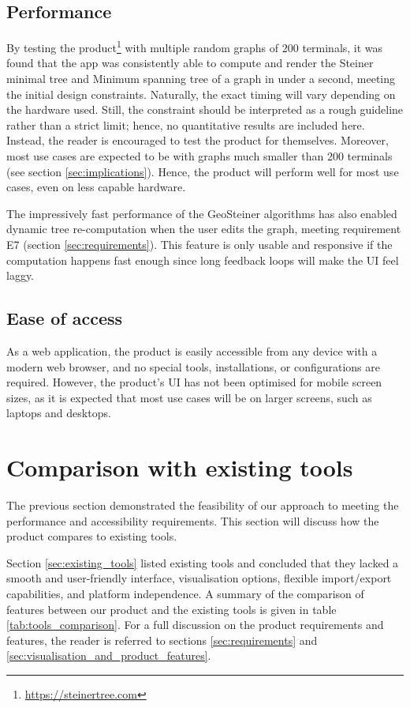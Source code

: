 \documentclass{l4proj}
\begin{document}
\subsection{Performance}
\label{sec:performance}
By testing the product\footnote{\url{https://steinertree.com}} with multiple random graphs of 200 terminals, it was found that the app was consistently able to compute and render the Steiner minimal tree and Minimum spanning tree of a graph in under a second, meeting the initial design constraints. Naturally, the exact timing will vary depending on the hardware used. Still, the constraint should be interpreted as a rough guideline rather than a strict limit; hence, no quantitative results are included here. Instead, the reader is encouraged to test the product for themselves. Moreover, most use cases are expected to be with graphs much smaller than 200 terminals (see section \ref{sec:implications}). Hence, the product will perform well for most use cases, even on less capable hardware.

The impressively fast performance of the GeoSteiner algorithms has also enabled dynamic tree re-computation when the user edits the graph, meeting requirement E7 (section \ref{sec:requirements}). This feature is only usable and responsive if the computation happens fast enough since long feedback loops will make the UI feel laggy.
\subsection{Ease of access}
As a web application, the product is easily accessible from any device with a modern web browser, and no special tools, installations, or configurations are required. However, the product's UI has not been optimised for mobile screen sizes, as it is expected that most use cases will be on larger screens, such as laptops and desktops.



\section{Comparison with existing tools}
The previous section demonstrated the feasibility of our approach to meeting the performance and accessibility requirements.
This section will discuss how the product compares to existing tools.

Section \ref{sec:existing_tools} listed existing tools and concluded that they lacked a smooth and user-friendly interface, visualisation options, flexible import/export capabilities, and platform independence. A summary of the comparison of features between our product and the existing tools is given in table \ref{tab:tools_comparison}. For a full discussion on the product requirements and features, the reader is referred to sections \ref{sec:requirements} and \ref{sec:visualisation_and_product_features}.
\end{document}
